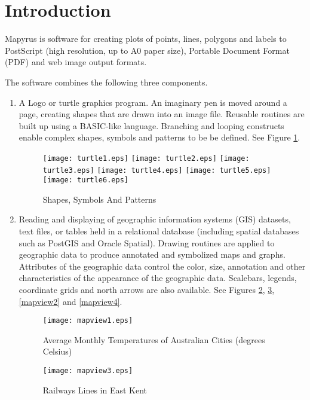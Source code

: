 
\section{Introduction}

Mapyrus is software for creating plots of points, lines, polygons and labels 
to PostScript (high resolution, up to A0 paper size),
Portable Document Format (PDF) and web image output formats.

The software combines the following three components.

\begin{enumerate}
\item

A Logo or turtle graphics program.  An imaginary pen is moved around a page,
creating shapes that are drawn into an image file.
Reusable routines are built up using a BASIC-like language.
Branching and looping constructs enable complex shapes, symbols and patterns
to be be defined.  See Figure \ref{turtle}.

\begin{figure}[htb]
\texttt{[image: turtle1.eps]}
\texttt{[image: turtle2.eps]}
\texttt{[image: turtle3.eps]}
\texttt{[image: turtle4.eps]}
\texttt{[image: turtle5.eps]}
\texttt{[image: turtle6.eps]}
\caption{Shapes, Symbols And Patterns}
\label{turtle}
\end{figure}

\item

Reading and displaying of geographic information
systems (GIS) datasets, text files, or tables held in a relational database
(including spatial databases such as PostGIS and Oracle Spatial).
Drawing routines are applied to geographic data to produce annotated and
symbolized maps and graphs.  Attributes of the geographic data control
the color, size, annotation and other characteristics of the
appearance of the geographic data.
Scalebars, legends, coordinate grids and north arrows are also available.
See Figures \ref{mapview1}, \ref{mapview3}, \ref{mapview2} and
\ref{mapview4}.

\begin{figure}
\texttt{[image: mapview1.eps]}
\caption[Average Monthly Temperatures]{Average Monthly Temperatures of Australian Cities (degrees Celsius)}
\label{mapview1}
\end{figure}

\begin{figure}
\texttt{[image: mapview3.eps]}
\caption{Railways Lines in East Kent}
\label{mapview3}
\end{figure}


\end{enumerate}

